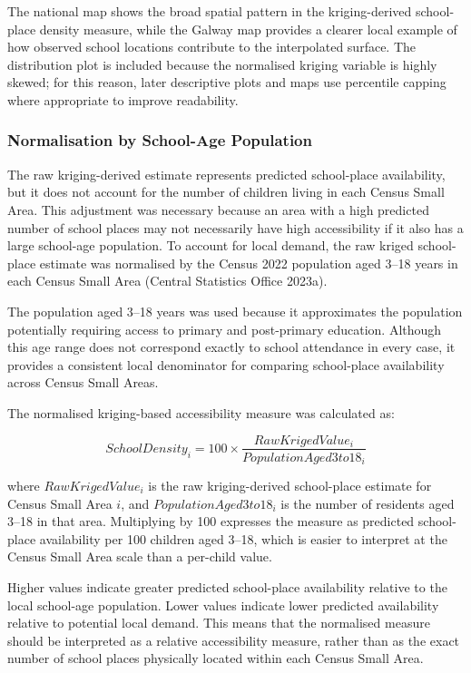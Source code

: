 \documentclass{article}
\begin{document}
The national map shows the broad spatial pattern in the kriging-derived
school-place density measure, while the Galway map provides a clearer
local example of how observed school locations contribute to the
interpolated surface. The distribution plot is included because the
normalised kriging variable is highly skewed; for this reason, later
descriptive plots and maps use percentile capping where appropriate to
improve readability.

\subsubsection{Normalisation by School-Age
Population}\label{normalisation-by-school-age-population}

The raw kriging-derived estimate represents predicted school-place
availability, but it does not account for the number of children living
in each Census Small Area. This adjustment was necessary because an area
with a high predicted number of school places may not necessarily have
high accessibility if it also has a large school-age population. To
account for local demand, the raw kriged school-place estimate was
normalised by the Census 2022 population aged 3--18 years in each Census
Small Area (Central Statistics Office 2023a).

The population aged 3--18 years was used because it approximates the
population potentially requiring access to primary and post-primary
education. Although this age range does not correspond exactly to school
attendance in every case, it provides a consistent local denominator for
comparing school-place availability across Census Small Areas.

The normalised kriging-based accessibility measure was calculated as:

\[
SchoolDensity_i =
100 \times
\frac{RawKrigedValue_i}{PopulationAged3to18_i}
\]

where \(RawKrigedValue_i\) is the raw kriging-derived school-place
estimate for Census Small Area \(i\), and \(PopulationAged3to18_i\) is
the number of residents aged 3--18 in that area. Multiplying by 100
expresses the measure as predicted school-place availability per 100
children aged 3--18, which is easier to interpret at the Census Small
Area scale than a per-child value.

Higher values indicate greater predicted school-place availability
relative to the local school-age population. Lower values indicate lower
predicted availability relative to potential local demand. This means
that the normalised measure should be interpreted as a relative
accessibility measure, rather than as the exact number of school places
physically located within each Census Small Area.
\end{document}
